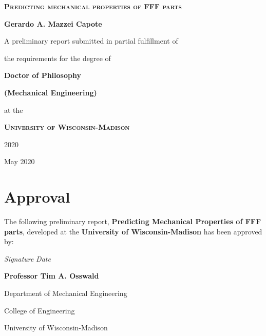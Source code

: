 \documentclass[main.tex]{subfiles}
\begin{document}
\begin{titlepage}
	\begin{center}
		\vspace{1cm}
		{\scshape\Huge\textbf{Predicting mechanical properties of FFF parts} \par}
		\vspace{1cm}
		{\LARGE\textbf{Gerardo A. Mazzei Capote} \par}
		\vspace{1cm}
		{\Large A preliminary report submitted in partial fulfillment of \par 
				the requirements for the degree of \par}
		\vspace{1cm}
		{\LARGE\textbf{Doctor of Philosophy} \par}
		{\LARGE\textbf{(Mechanical Engineering)} \par}
		\vspace{1cm}
		{\Large at the \par}
		\vspace{0.5cm}
		{\scshape\LARGE\textbf{ University of Wisconsin-Madison} \par}
		\vspace{0.5cm}
		{\Large 2020 \par}
		\vfill
		{\large May 2020}		%
	\end{center}
\end{titlepage}

\pagestyle{empty}
\cleardoublepage
\setcounter{page}{1}

\chapter*{Approval}
The following preliminary report, \textbf{Predicting Mechanical Properties of FFF parts}, developed at the \textbf{University of Wisconsin-Madison}
has been approved by:
\vspace{2cm}

\noindent
\makebox[7cm]{\hrulefill} \hfill\makebox[4cm]{\hrulefill}
\par\noindent
\textit{Signature} \hfill\textit{Date}\hspace{3cm}
\vspace{5 mm}
\par\noindent
\textbf{Professor Tim A. Osswald}
\par\noindent Department of Mechanical Engineering
\par\noindent College of Engineering
\par\noindent University of Wisconsin-Madison

\cleardoublepage
\end{document}
